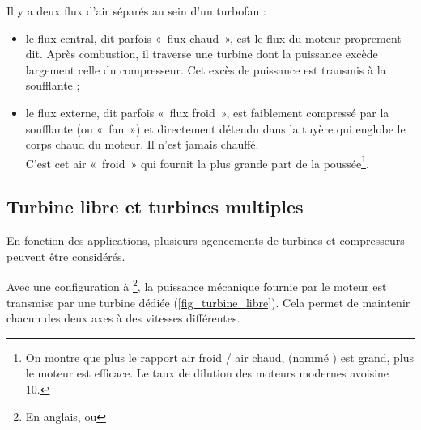 {{		Il y a deux flux d’air séparés au sein d’un turbofan :

		\begin{itemize}
			\item le flux central, dit parfois «~flux chaud~», est le flux du moteur proprement dit. Après combustion, il traverse une turbine dont la puissance excède largement celle du compresseur. Cet excès de puissance est transmis à la soufflante ;
			\item le flux externe, dit parfois «~flux froid~», est faiblement compressé par la soufflante (ou «~fan~») et directement détendu dans la tuyère qui englobe le corps chaud du moteur. Il n’est jamais chauffé.\\
			C’est cet air «~froid~» qui fournit la plus grande part de la poussée\footnote{On montre que plus le rapport air froid / air chaud, (nommé ) est grand, plus le moteur est efficace. Le taux de dilution des moteurs modernes avoisine \num{10}.}\nolinebreak.
		\end{itemize}
		 

	\subsection{Turbine libre et turbines multiples}

		En fonction des applications, plusieurs agencements de turbines et compresseurs peuvent être considérés.

		Avec une configuration à \footnote{En anglais,  ou }, la puissance mécanique fournie par le moteur est transmise par une turbine dédiée (\cref{fig_turbine_libre}). Cela permet de maintenir chacun des deux axes à des vitesses différentes.

}}
